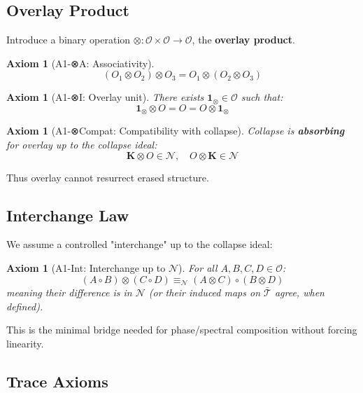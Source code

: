 \documentclass[12pt, oneside]{article}
\newtheorem{axiom}[theorem]{Axiom}
\newcommand{\K}{\mathbf{K}}
\newcommand{\N}{\mathcal{N}}
\newcommand{\T}{\mathcal{T}}
\newcommand{\Opr}{\mathcal{O}}
\begin{document}
\subsection{Overlay Product}

Introduce a binary operation $\otimes: \Opr \times \Opr \rightarrow \Opr$, the \textbf{overlay product}.

\begin{axiom}[A1-⊗A: Associativity]
\begin{equation}
(O_1 \otimes O_2) \otimes O_3 = O_1 \otimes (O_2 \otimes O_3)
\end{equation}
\end{axiom}

\begin{axiom}[A1-⊗I: Overlay unit]
There exists $\mathbf{1}_\otimes \in \Opr$ such that:
\begin{equation}
\mathbf{1}_\otimes \otimes O = O = O \otimes \mathbf{1}_\otimes
\end{equation}
\end{axiom}

\begin{axiom}[A1-⊗Compat: Compatibility with collapse]
Collapse is \textbf{absorbing} for overlay up to the collapse ideal:
\begin{equation}
\K \otimes O \in \N,\quad O \otimes \K \in \N
\end{equation}
\end{axiom}

Thus overlay cannot resurrect erased structure.

\subsection{Interchange Law}

We assume a controlled "interchange" up to the collapse ideal:

\begin{axiom}[A1-Int: Interchange up to $\N$]
For all $A, B, C, D \in \Opr$:
\begin{equation}
(A \circ B) \otimes (C \circ D) \equiv_\N (A \otimes C) \circ (B \otimes D)
\end{equation}
meaning their difference is in $\N$ (or their induced maps on $\bar{\T}$ agree, when defined).
\end{axiom}

This is the minimal bridge needed for phase/spectral composition without forcing linearity.

\subsection{Trace Axioms}
\end{document}
